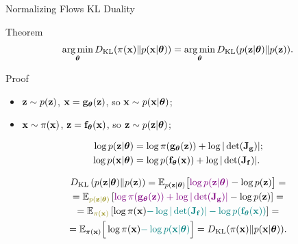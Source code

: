 \documentclass{beamer}
\begin{document}
\begin{frame}{Normalizing Flows KL Duality}
	\begin{block}{Theorem}
		\vspace{-0.3cm}
		\[
			\operatorname*{arg\,min}_{\boldsymbol{\theta}} D_\mathrm{KL}(\pi(\mathbf{x}) \| p(\mathbf{x} | \boldsymbol{\theta})) = \operatorname*{arg\,min}_{\boldsymbol{\theta}} D_\mathrm{KL}(p(\mathbf{z} | \boldsymbol{\theta}) \| p(\mathbf{z})).
		\]
		\vspace{-0.7cm}
	\end{block}
	\begin{block}{Proof}
		\begin{itemize}
			\item $\mathbf{z} \sim p(\mathbf{z})$, $\mathbf{x} = \mathbf{g}_{\boldsymbol{\theta}}(\mathbf{z})$, so $\mathbf{x} \sim p(\mathbf{x}| \boldsymbol{\theta})$;
			\item $\mathbf{x} \sim \pi(\mathbf{x})$, $\mathbf{z} = \mathbf{f}_{\boldsymbol{\theta}}(\mathbf{x})$, so $\mathbf{z} \sim p(\mathbf{z} | \boldsymbol{\theta})$;
		\end{itemize}
        
		\vspace{-0.3cm}
		\begin{align*}
			\log p(\mathbf{z} | \boldsymbol{\theta}) &= \log \pi(\mathbf{g}_{\boldsymbol{\theta}}(\mathbf{z})) + \log | \det ( \mathbf{J}_{\mathbf{g}}) |; \\
			\log p(\mathbf{x} | \boldsymbol{\theta}) &= \log p(\mathbf{f}_{\boldsymbol{\theta}}(\mathbf{x})) + \log | \det ( \mathbf{J}_{\mathbf{f}}) |.
		\end{align*}
        
		\vspace{-1.0cm}
		\begin{multline*}
			\KL\left(p(\bz | \btheta) \| p(\bz) \right) = \bbE_{p(\bz | \btheta)} \bigl[ {\color{violet}\log p(\bz | \btheta)} - \log p(\bz) \bigr]
			 = \\ = \bbE_{{\color{olive}p(\bz | \btheta)}} \left[ {\color{violet}\log \pi(\bg_{\btheta}(\bz)) +  \log |\det (\bJ_\bg)|} - \log p(\bz) \right]
			 = \\ = \bbE_{{\color{olive}\pi(\bx)}} \left[ \log \pi(\bx) {\color{teal} - \log |\det (\bJ_\bff)| - \log p(\bff_{\btheta}(\bx))} \right]
			 = \\ = \bbE_{\pi(\bx)} \Big[ \log \pi(\bx) {\color{teal} -\log p(\bx | \btheta)} \Big] = \KL (\pi(\bx) \| p(\bx | \btheta)).
		\end{multline*}
	\end{block}
\end{frame}
\end{document}
